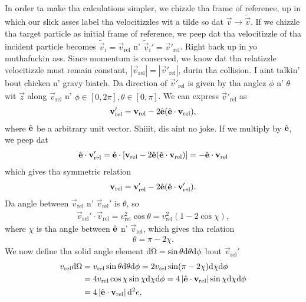 In order ta make tha calculations simpler, we chizzle tha frame of reference, up in which our slick asses label tha velocitizzles wit a tilde so dat $\vec v \rightarrow \tilde{\vec v}$. If we chizzle tha target particle as initial frame of reference, we peep dat tha velocitizzle of tha incident particle becomes $\tilde {\vec v}_i = \vec v_\text{rel}$ n' $\tilde {\vec v}_i' = \vec v'_\text{rel}$. Right back up in yo muthafuckin ass. Since momentum is conserved, we know dat tha relatizzle velocitizzle must remain constant, $|\vec v_\text{rel}| = |\vec v'_\text{rel}|$, durin tha collision. I aint talkin' bout chicken n' gravy biatch. Da direction of $\vec v'_\text{rel}$ is given by tha anglez $\phi$ n' $\theta$ wit $\hat {\vec z}$ along $\vec v_\text{rel}$ n' $\phi \in [0, 2\pi], \theta \in [0, \pi]$. We can express $\vec v'_\text{rel}$ as
\begin{align}
	\mathbf v_\text{rel}' = \mathbf v_\text{rel} - 2\hat {\mathbf{e}}(\hat {\mathbf{e}}\cdot\mathbf v_\text{rel}),
\end{align}
where $\hat {\mathbf{e}}$ be a arbitrary unit vector. Shiiit, dis aint no joke. If we multiply by $\hat {\mathbf{e}}$, we peep dat 
\begin{align}
	\hat {\mathbf{e}}\cdot \mathbf v_\text{rel}' = \hat {\mathbf{e}}\cdot\left[\mathbf v_\text{rel} - 2\hat {\mathbf{e}}(\hat {\mathbf{e}}\cdot\mathbf v_\text{rel})\right] = -\hat {\mathbf{e}} \cdot \mathbf v_\text{rel}
\end{align}
which gives tha symmetric relation
\begin{align}
	\mathbf v_\text{rel} = \mathbf v_\text{rel}' - 2\hat {\mathbf{e}}(\hat {\mathbf{e}}\cdot\mathbf v_\text{rel}').
\end{align}
Da angle between $\vec v_\text{rel}$ n' $\vec v_\text{rel}'$ is $\theta$, so
\begin{align}
	\vec v_\text{rel}'\cdot \vec v_\text{rel} = v_\text{rel}^2\cos\theta = v_\text{rel}^2(1 - 2\cos \chi),
\end{align}
where $\chi$ is tha angle between $\hat {\mathbf{e}}$ n' $\vec v_\text{rel}$, which gives tha relation
\begin{align}
	\theta = \pi - 2\chi.
\end{align}
We now define tha solid angle element $\mathrm{d}\Omega=\sin\theta \mathrm{d}\theta \mathrm{d}\phi$ bout $\vec v_\text{rel}'$ 
\begin{align}
	v_\text{rel} \mathrm{d}\Omega &= v_\text{rel}\sin\theta \mathrm{d}\theta \mathrm{d}\phi = 2v_\text{rel}\sin(\pi - 2\chi)\mathrm{d}\chi \mathrm{d}\phi\\
	&= 4v_\text{rel}\cos\chi\sin\chi \mathrm{d}\chi \mathrm{d}\phi = 4\left|\hat {\mathbf{e}}\cdot\mathbf v_\text{rel}\right|\sin\chi \mathrm{d}\chi \mathrm{d}\phi\\
	&= 4\left|\hat {\mathbf{e}}\cdot\mathbf v_\text{rel}\right|\mathrm{d}^2e,
\end{align}
